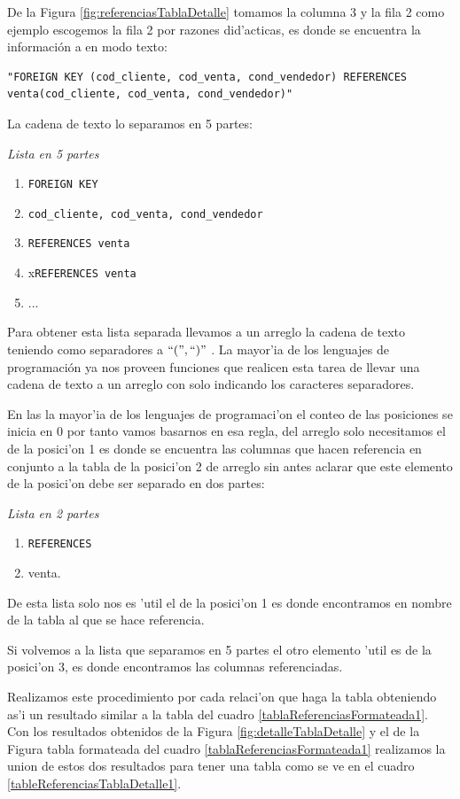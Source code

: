 De la Figura \ref{fig:referenciasTablaDetalle} tomamos la columna 3 y la fila 2 como ejemplo escogemos la fila 2 por razones did'acticas, es donde se encuentra la informaci\'on a en modo texto:
\lstset{language=sql,breaklines=true}
\begin{lstlisting}
"FOREIGN KEY (cod_cliente, cod_venta, cond_vendedor) REFERENCES venta(cod_cliente, cod_venta, cond_vendedor)"
\end{lstlisting}
 La cadena de texto lo separamos en 5 partes:
 
 \textit{Lista en 5 partes}
 \begin{enumerate}
 \item \texttt{FOREIGN KEY}
 \item \texttt{cod\_cliente, cod\_venta, cond\_vendedor}
 \item \texttt{REFERENCES venta}
 \item x\texttt{REFERENCES venta}
 \item ...
 \end{enumerate}
 
 Para obtener esta lista separada llevamos a un arreglo la cadena de texto teniendo como separadores a
 $ ``(" , ``)" $ . La mayor'ia de los lenguajes de programaci\'on ya nos proveen funciones que realicen esta tarea de llevar una cadena de texto a un arreglo con solo indicando los caracteres separadores.
 
 En las la mayor'ia de los lenguajes de programaci'on el conteo de las posiciones se inicia en 0 por tanto vamos basarnos en esa regla, del arreglo solo necesitamos el de la posici'on 1 es donde se encuentra las columnas que hacen referencia en conjunto a la tabla de la posici'on 2 de arreglo sin antes aclarar que este elemento de la posici'on debe ser separado en dos partes:
 
\textit{Lista en 2 partes} 
 \begin{enumerate}
 \item \texttt{REFERENCES}
 \item venta.
\end{enumerate}  

De esta lista solo nos es 'util el de la posici'on 1 es donde encontramos en nombre de la tabla al que se hace referencia.

Si volvemos a la lista que separamos en 5 partes el otro elemento 'util es de la posici'on 3, es donde encontramos las columnas referenciadas.

Realizamos este procedimiento por cada relaci'on que haga la tabla obteniendo as'i un resultado similar a la tabla del cuadro \ref{tablaReferenciasFormateada1}.
Con los resultados obtenidos de la Figura \ref{fig:detalleTablaDetalle} y el de la Figura tabla formateada del cuadro \ref{tablaReferenciasFormateada1} realizamos la union de estos dos resultados para tener una tabla como se ve en el cuadro \ref{tableReferenciasTablaDetalle1}.

